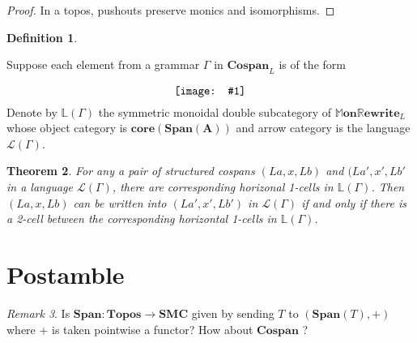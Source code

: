 \documentclass{amsart}
\newcommand{\LL}{\mathbb{L}}
\newcommand{\A}{\cat{A}}
\newcommand{\core}{\mathbf{core}}
\newcommand{\cat}[1]{\mathbf{#1}}
\newcommand{\from}{\colon}
\newcommand{\diagram}[1]{\raisebox{-0.5\height}{\texttt{[image: \#1]}}}
\newcommand{\Span}{\mathbf{Span}}
\newcommand{\Cospan}{\mathbf{Cospan}}
\newcommand{\MMonRewrite}{ \mathbb{M}\mathbf{on}\mathbb{R}\mathbf{ewrite} }
\newtheorem{theorem}{Theorem}[section]
\theoremstyle{remark}
\newtheorem{remark}[theorem]{Remark}
\theoremstyle{definition}
\newtheorem{definition}[theorem]{Definition}
\begin{document}
\begin{proof}

  In a topos, pushouts preserve monics and isomorphisms.
  
\end{proof}


\begin{definition} \label{df:gramr-gen-dbl-cat}
	
  Suppose each element from a grammar $ \Gamma $ in $ \Cospan_{L} $ is
  of the form
  \[
    \diagram{diag_lr-grammar-2cell}
  \]
  Denote by $ \LL ( \Gamma ) $ the symmetric monoidal double
  subcategory of $ \MMonRewrite_{L} $ whose object category is
  \( \core ( \Span ( \A ) ) \) and arrow category is the language
  $ \mathcal{L} ( \Gamma ) $.
        
\end{definition}


\begin{theorem}
  
  For any a pair of structured cospans \( (La,x,Lb) \) and
  \( (La',x',Lb' \) in a language \( \mathcal{L} (\Gamma) \), there
  are corresponding horizonal 1-cells in \( \LL (\Gamma) \). Then
  \( (La,x,Lb) \) can be written into \( (La',x',Lb') \) in
  \( \mathcal{L} (\Gamma) \) if and only if there is a 2-cell between
  the corresponding horizontal 1-cells in \( \LL (\Gamma) \).
  
\end{theorem}


\section{Postamble} \label{sec:postable}


\begin{remark}
  Is \( \Span \from \cat{Topos} \to \cat{SMC}
  \) given by sending \( T \) to \( (\Span (T),+) \) where \( + \) is
  taken pointwise a functor?  How about \( \Cospan \) ?
\end{remark}




\end{document}
